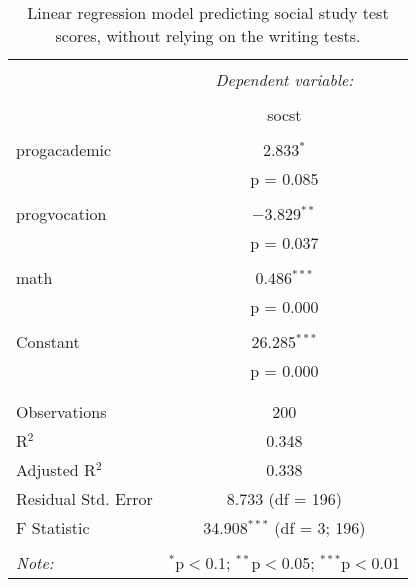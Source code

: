 
\begin{table}[!htbp] \centering 
  \caption{Linear regression model predicting social study test scores, 
          without relying on the writing tests.} 
  \label{tab::lm_socst_nopeeking} 
\begin{tabular}{@{\extracolsep{5pt}}lc} 
\\[-1.8ex]\hline 
\hline \\[-1.8ex] 
 & \multicolumn{1}{c}{\textit{Dependent variable:}} \\ 
\cline{2-2} 
\\[-1.8ex] & socst \\ 
\hline \\[-1.8ex] 
 progacademic & 2.833$^{*}$ \\ 
  & p = 0.085 \\ 
  & \\ 
 progvocation & $-$3.829$^{**}$ \\ 
  & p = 0.037 \\ 
  & \\ 
 math & 0.486$^{***}$ \\ 
  & p = 0.000 \\ 
  & \\ 
 Constant & 26.285$^{***}$ \\ 
  & p = 0.000 \\ 
  & \\ 
\hline \\[-1.8ex] 
Observations & 200 \\ 
R$^{2}$ & 0.348 \\ 
Adjusted R$^{2}$ & 0.338 \\ 
Residual Std. Error & 8.733 (df = 196) \\ 
F Statistic & 34.908$^{***}$ (df = 3; 196) \\ 
\hline 
\hline \\[-1.8ex] 
\textit{Note:}  & \multicolumn{1}{r}{$^{*}$p$<$0.1; $^{**}$p$<$0.05; $^{***}$p$<$0.01} \\ 
\end{tabular} 
\end{table} 
